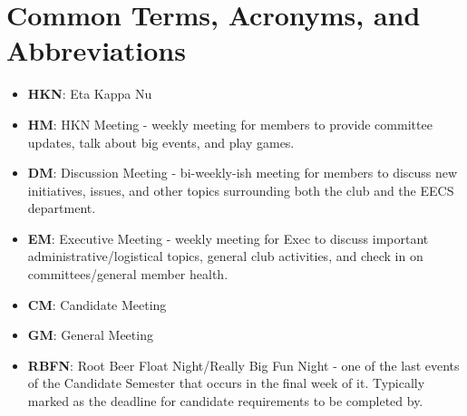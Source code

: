 \documentclass[11pt, article, oneside]{memoir}
\begin{document}
    \chapter{Common Terms, Acronyms, and Abbreviations}
    \begin{itemize}
        \item \textbf{HKN}: Eta Kappa Nu
        \item \textbf{HM}: HKN Meeting - weekly meeting for members to provide committee updates, talk about big events, and play games.
        \item \textbf{DM}: Discussion Meeting - bi-weekly-ish meeting for members to discuss new initiatives, issues, and other topics surrounding both the club and the EECS department.
        \item \textbf{EM}: Executive Meeting - weekly meeting for Exec to discuss important administrative/logistical topics, general club activities, and check in on committees/general member health.
        \item \textbf{CM}: Candidate Meeting
        \item \textbf{GM}: General Meeting
        \item \textbf{RBFN}: Root Beer Float Night/Really Big Fun Night - one of the last events of the Candidate Semester that occurs in the final week of it. Typically marked as the deadline for candidate requirements to be completed by.
    \end{itemize}
    
\end{document}

